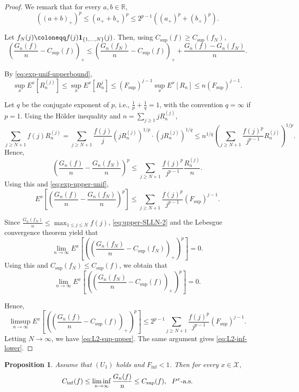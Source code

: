\documentclass[a4paper, reqno, 11pt]{amsart}
\newtheorem{Prop}[Thm]{Proposition}
\theoremstyle{definition}
\begin{document}
\begin{proof}
We remark that for every $a, b \in \mathbb{R}$, 
\[ ((a+b)_{+})^p \le (a_{+} + b_{+})^p \le 2^{p-1}((a_{+})^p + (b_{+})^p). \]

Let $f_N (j) \coloneqq f(j) {\bf 1}_{\{1,\dots, N\}}(j)$. 
Then, using $C_{\sup}(f) \ge C_{\sup}(f_N)$, 
\[ \left( \frac{G_n (f)}{n} - C_{\sup}(f) \right)_+ \le \left( \frac{G_n (f_N)}{n} - C_{\sup}(f) \right)_{+} + \frac{G_n (f) - G_n (f_N)}{n}.  \]

By \eqref{eq:exp-unif-upperbound}, 
\begin{equation}\label{eq:exp-upper-unif} 
\sup_x E^x \left[R_n^{(j)} \right] \le \sup_x E^x \left[R_n^{j} \right] \le (F_{\sup})^{j-1} \sup_x E^x \left[R_n \right] \le n (F_{\sup})^{j-1}. 
\end{equation}

Let $q$ be  the conjugate exponent of $p$, i.e., $\frac{1}{p} + \frac{1}{q} = 1$, with the convention $q=\infty$ if $p=1$. 
Using the H\"older inequality  and $n = \sum_{j \ge 1} j R_n^{(j)}$, 
\[ \sum_{j \ge N+1} f(j) R_n^{(j)} = \sum_{j \ge N+1} \frac{f(j)}{j} (j R_n^{(j)})^{1/p} \cdot (j R_n^{(j)})^{1/q} \le n^{1/q} \left(\sum_{j \ge N+1} \frac{f(j)^p}{j^{p-1}} R_n^{(j)}\right)^{1/p}. \]
Hence, 
\[ \left(  \frac{G_n (f)}{n} -  \frac{G_n (f_N)}{n} \right)^p  \le \sum_{j \ge N+1} \frac{f(j)^p}{j^{p-1}} \frac{R_n^{(j)}}{n}.  \]
Using this and \eqref{eq:exp-upper-unif}, 
\[ E^x \left[ \left(  \frac{G_n (f)}{n} -  \frac{G_n (f_N)}{n} \right)^p \right] \le \sum_{j \ge N+1} \frac{f(j)^p}{j^{p-1}}(F_{\sup})^{j-1}.  \]

Since $ \frac{G_n (f_N)}{n} \le \max_{1 \le j \le N} f(j)$, 
\eqref{eq:upper-SLLN-2} and the Lebesgue convergence theorem yield that 
\[ \lim_{n \to \infty} E^x \left[ \left( \left( \frac{G_n (f_N)}{n} -  C_{\sup}(f_N)  \right)_{+} \right)^p \right] = 0. \]
Using this and $  C_{\sup}(f_N) \le   C_{\sup}(f)$, we obtain that 
\[ \lim_{n \to \infty} E^x \left[ \left( \left( \frac{G_n (f_N)}{n} -  C_{\sup}(f)  \right)_{+} \right)^p \right] = 0. \]

Hence, 
\[  \limsup_{n \to \infty} E^x \left[ \left(\left( \frac{G_n (f)}{n} - C_{\sup}(f) \right)_{+}\right)^p \right] \le 2^{p-1} \sum_{j \ge N+1} \frac{f(j)^p}{j^{p-1}}(F_{\sup})^{j-1}. \]
Letting $N \to \infty$, we have \eqref{eq:L2-sup-upper}. 
The same argument gives  \eqref{eq:L2-inf-lower}.  
\end{proof}

\begin{Prop}
Assume that $(U_1)$ holds and $F_{\inf} < 1$. 
Then for every $x \in \mathcal{X}$, 
\begin{equation}\label{eq:inf-sup-sandwich} 
C_{\inf}(f) \le \liminf_{n \to \infty} \frac{G_n (f)}{n} \le C_{\sup}(f), \ \textup{ $P^x$-a.s.}  
\end{equation}
\end{Prop}
\end{document}
